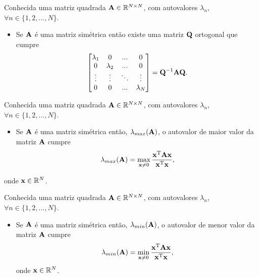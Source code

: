 \begin{theorem}\label{theo:simetricmatrix2}
Conhecida uma matriz quadrada $\MATRIX{A} \in \mathbb{R}^{N \times N}$, 
com  autovalores $\lambda_n$, $\forall n \in \{1, 2, ..., N\}$.
\begin{itemize}
\item Se $\MATRIX{A}$ é uma matriz simétrica então
existe uma matriz $\MATRIX{Q}$ ortogonal que cumpre \cite[pp. 67,440]{golub2013matrix}
\begin{equation}
\begin{bmatrix}
\lambda_1 & 0         & ...    & 0 \\
0         & \lambda_2 & ...    & 0 \\
\vdots    & \vdots    & \ddots & \vdots \\
0         & 0         & ...    & \lambda_N
\end{bmatrix}
=\MATRIX{Q}^{-1}\MATRIX{A}\MATRIX{Q}.
\end{equation}
\end{itemize}
\end{theorem}


\begin{theorem}\label{theo:simetricmatrix3}
Conhecida uma matriz quadrada $\MATRIX{A} \in \mathbb{R}^{N \times N}$, 
com  autovalores $\lambda_n$, $\forall n \in \{1, 2, ..., N\}$.
\begin{itemize}
\item Se $\MATRIX{A}$ é uma matriz simétrica então, $\lambda_{max}(\MATRIX{A})$,
o autovalor de maior valor da  matriz $\MATRIX{A}$ cumpre \cite[pp. 67]{golub2013matrix}
\begin{equation}
\lambda_{max}(\MATRIX{A}) = \max_{\VECTOR{x}\neq 0} \frac{\VECTOR{x}^{\transpose}\MATRIX{A}\VECTOR{x}}{\VECTOR{x}^{\transpose}\VECTOR{x}},
\end{equation}
\end{itemize}
onde $\VECTOR{x} \in \mathbb{R}^N$.
\end{theorem}

\begin{theorem}\label{theo:simetricmatrix4}
Conhecida uma matriz quadrada $\MATRIX{A} \in \mathbb{R}^{N \times N}$, 
com  autovalores $\lambda_n$, $\forall n \in \{1, 2, ..., N\}$.
\begin{itemize}
\item Se $\MATRIX{A}$ é uma matriz simétrica então, $\lambda_{min}(\MATRIX{A})$,
o autovalor de menor valor da  matriz $\MATRIX{A}$ cumpre \cite[pp. 67]{golub2013matrix}
\begin{equation}
\lambda_{min}(\MATRIX{A}) = \min_{\VECTOR{x}\neq 0} \frac{\VECTOR{x}^{\transpose}\MATRIX{A}\VECTOR{x}}{\VECTOR{x}^{\transpose}\VECTOR{x}},
\end{equation}
onde $\VECTOR{x} \in \mathbb{R}^N$.
\end{itemize}
\end{theorem}
